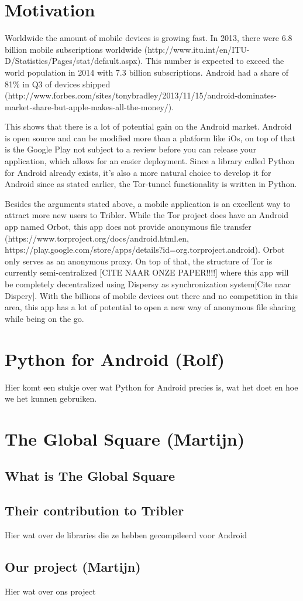 \documentclass[11pt]{article}
\begin{document}
\section{Motivation}
Worldwide the amount of mobile devices is growing fast. In 2013, there were 6.8 billion mobile subscriptions worldwide (http://www.itu.int/en/ITU-D/Statistics/Pages/stat/default.aspx). This number is expected to exceed the world population in 2014 with 7.3 billion subscriptions. Android had a share of 81\% in Q3 of devices shipped (http://www.forbes.com/sites/tonybradley/2013/11/15/android-dominates-market-share-but-apple-makes-all-the-money/).

This shows that there is a lot of potential gain on the Android market. Android is open source and can be modified more than a platform like iOs, on top of that is the Google Play not subject to a review before you can release your application, which allows for an easier deployment. Since a library called Python for Android already exists, it's also a more natural choice to develop it for Android since as stated earlier, the Tor-tunnel functionality is written in Python.

Besides the arguments stated above, a mobile application is an excellent way to attract more new users to Tribler. While the Tor project does have an Android app named Orbot, this app does not provide anonymous file transfer (https://www.torproject.org/docs/android.html.en, https://play.google.com/store/apps/details?id=org.torproject.android). Orbot only serves as an anonymous proxy. On top of that, the structure of Tor is currently semi-centralized [CITE NAAR ONZE PAPER!!!!] where this app will be completely decentralized using Dispersy as synchronization system[Cite naar Dispery]. With the billions of mobile devices out there and no competition in this area, this app has a lot of potential to open a new way of anonymous file sharing while being on the go.

\section{Python for Android (Rolf)}
Hier komt een stukje over wat Python for Android precies is, wat het doet en hoe we het kunnen gebruiken.

\section{The Global Square (Martijn)}

\subsection{What is The Global Square}

\subsection{Their contribution to Tribler}
Hier wat over de libraries die ze hebben gecompileerd voor Android

\subsection{Our project (Martijn)}
Hier wat over ons project
\end{document}
